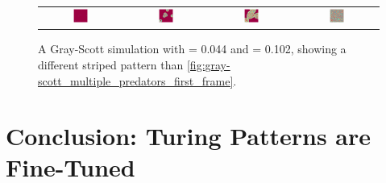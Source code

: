 \begin{figure}[h]
\centering
\mySfFamily
\begin{tabular}{c c c c}
\includegraphics[width = 0.19\textwidth]{../images/f044_k102_multi_Moment_1} & \includegraphics[width = 0.19\textwidth]{../images/f044_k102_multi_Moment_2} & \includegraphics[width = 0.19\textwidth]{../images/f044_k102_multi_Moment_3} & \includegraphics[width = 0.19\textwidth]{../images/f044_k102_multi_Moment_4}
\end{tabular}
\caption{A Gray-Scott simulation with  = 0.044 and  = 0.102, showing a different striped pattern than \autoref{fig:gray-scott_multiple_predators_first_frame}.}
\label{fig:gray-scott_f44_k102_first_frame}
\end{figure}


\FloatBarrier
{}

\section{Conclusion: Turing Patterns are Fine-Tuned}
\label{sec:conclusion:_turing_patterns_are_fine-tuned}


